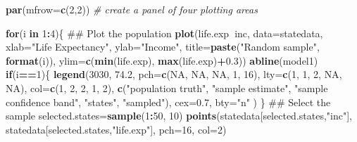 \documentclass[]{article}
\newenvironment{Shaded}{\begin{snugshade}}{\end{snugshade}}
\newcommand{\KeywordTok}[1]{\textcolor[rgb]{0.13,0.29,0.53}{\textbf{#1}}}
\newcommand{\DataTypeTok}[1]{\textcolor[rgb]{0.13,0.29,0.53}{#1}}
\newcommand{\DecValTok}[1]{\textcolor[rgb]{0.00,0.00,0.81}{#1}}
\newcommand{\FloatTok}[1]{\textcolor[rgb]{0.00,0.00,0.81}{#1}}
\newcommand{\StringTok}[1]{\textcolor[rgb]{0.31,0.60,0.02}{#1}}
\newcommand{\CommentTok}[1]{\textcolor[rgb]{0.56,0.35,0.01}{\textit{#1}}}
\newcommand{\OtherTok}[1]{\textcolor[rgb]{0.56,0.35,0.01}{#1}}
\newcommand{\ControlFlowTok}[1]{\textcolor[rgb]{0.13,0.29,0.53}{\textbf{#1}}}
\newcommand{\OperatorTok}[1]{\textcolor[rgb]{0.81,0.36,0.00}{\textbf{#1}}}
\newcommand{\NormalTok}[1]{#1}
\begin{document}
\begin{Shaded}
\begin{Highlighting}[]
\KeywordTok{par}\NormalTok{(}\DataTypeTok{mfrow=}\KeywordTok{c}\NormalTok{(}\DecValTok{2}\NormalTok{,}\DecValTok{2}\NormalTok{)) }\CommentTok{# create a panel of four plotting areas}

\ControlFlowTok{for}\NormalTok{(i }\ControlFlowTok{in} \DecValTok{1}\OperatorTok{:}\DecValTok{4}\NormalTok{)\{}
\NormalTok{  ## Plot the population}
  \KeywordTok{plot}\NormalTok{(life.exp}\OperatorTok{~}\NormalTok{inc, }\DataTypeTok{data=}\NormalTok{statedata,}
       \DataTypeTok{xlab=}\StringTok{"Life Expectancy"}\NormalTok{, }\DataTypeTok{ylab=}\StringTok{"Income"}\NormalTok{,}
       \DataTypeTok{title=}\KeywordTok{paste}\NormalTok{(}\StringTok{"Random sample"}\NormalTok{, }\KeywordTok{format}\NormalTok{(i)),}
       \DataTypeTok{ylim=}\KeywordTok{c}\NormalTok{(}\KeywordTok{min}\NormalTok{(life.exp), }\KeywordTok{max}\NormalTok{(life.exp)}\OperatorTok{+}\FloatTok{0.3}\NormalTok{))}
  \KeywordTok{abline}\NormalTok{(model1)}
  \ControlFlowTok{if}\NormalTok{(i}\OperatorTok{==}\DecValTok{1}\NormalTok{)\{}
    \KeywordTok{legend}\NormalTok{(}\DecValTok{3030}\NormalTok{, }\FloatTok{74.2}\NormalTok{, }
           \DataTypeTok{pch=}\KeywordTok{c}\NormalTok{(}\OtherTok{NA}\NormalTok{, }\OtherTok{NA}\NormalTok{, }\OtherTok{NA}\NormalTok{, }\DecValTok{1}\NormalTok{, }\DecValTok{16}\NormalTok{), }
           \DataTypeTok{lty=}\KeywordTok{c}\NormalTok{(}\DecValTok{1}\NormalTok{, }\DecValTok{1}\NormalTok{, }\DecValTok{2}\NormalTok{, }\OtherTok{NA}\NormalTok{, }\OtherTok{NA}\NormalTok{),}
           \DataTypeTok{col=}\KeywordTok{c}\NormalTok{(}\DecValTok{1}\NormalTok{, }\DecValTok{2}\NormalTok{, }\DecValTok{2}\NormalTok{, }\DecValTok{1}\NormalTok{, }\DecValTok{2}\NormalTok{),}
           \KeywordTok{c}\NormalTok{(}\StringTok{"population truth"}\NormalTok{, }\StringTok{"sample estimate"}\NormalTok{,}
             \StringTok{"sample confidence band"}\NormalTok{, }
             \StringTok{"states"}\NormalTok{, }\StringTok{"sampled"}\NormalTok{),}
           \DataTypeTok{cex=}\FloatTok{0.7}\NormalTok{,}
           \DataTypeTok{bty=}\StringTok{"n"}
\NormalTok{           )}
\NormalTok{  \}}
\NormalTok{  ## Select the sample}
\NormalTok{  selected.states=}\KeywordTok{sample}\NormalTok{(}\DecValTok{1}\OperatorTok{:}\DecValTok{50}\NormalTok{, }\DecValTok{10}\NormalTok{)}
  \KeywordTok{points}\NormalTok{(statedata[selected.states,}\StringTok{"inc"}\NormalTok{], }
\NormalTok{         statedata[selected.states,}\StringTok{"life.exp"}\NormalTok{], }\DataTypeTok{pch=}\DecValTok{16}\NormalTok{, }\DataTypeTok{col=}\DecValTok{2}\NormalTok{)}

\end{Highlighting}
\end{Shaded}
\end{document}
